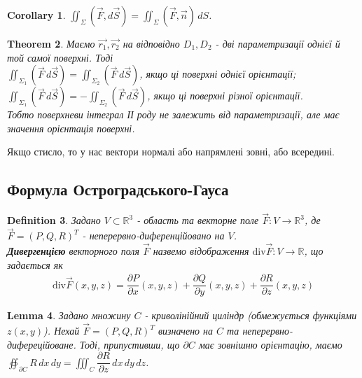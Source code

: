 \documentclass[a4paper, 10pt]{article}
\def\departial#1#2{\dfrac{\partial {#1}}{\partial {#2}}}
\theoremstyle{theoremdd}
\newtheorem{theorem}{Theorem}[subsection]
\theoremstyle{theoremdd}
\newtheorem{definition}[theorem]{Definition}
\theoremstyle{theoremdd}
\theoremstyle{theoremdd}
\theoremstyle{theoremdd}
\theoremstyle{theoremdd}
\theoremstyle{theoremdd}
\newtheorem{lemma}[theorem]{Lemma}
\theoremstyle{theoremdd}
\newtheorem{corollary}[theorem]{Corollary}
\begin{document}
\begin{corollary}
$\displaystyle\iint_\Sigma (\vec{F}, d\vec{S}) = \iint_\Sigma (\vec{F}, \vec{n})\,dS$.
\end{corollary}

\begin{theorem}
Маємо $\vec{r_1},\vec{r_2}$ на відповідно $D_1, D_2$ - дві параметризації однієї й той самої поверхні. Тоді\\
$\displaystyle\iint_{\Sigma_1} (\vec{F}\,d\vec{S}) = \iint_{\Sigma_2} (\vec{F}\,d\vec{S})$, якщо ці поверхні однієї орієнтації;\\
$\displaystyle\iint_{\Sigma_1 } (\vec{F}\,d\vec{S}) = -\iint_{\Sigma_2} (\vec{F}\,d\vec{S})$, якщо ці поверхні різної орієнтації.\\
Тобто поверхневи інтеграл ІІ роду не залежить від параметризації, але має значення орієнтація поверхні.
\end{theorem}

Якщо стисло, то у нас вектори нормалі або напрямлені зовні, або всередині.

\subsection{Формула Остроградського-Гауса}
\begin{definition}
Задано $V \subset \mathbb{R}^3$ - область та векторне поле $\vec{F}: V \to \mathbb{R}^3$, де $\vec{F} = (P,Q,R)^T$ - неперервно-диференційовано на $V$.\\
\textbf{Дивергенцією} векторного поля $\vec{F}$ назвемо відображення $\text{div} \vec{F}: V \to \mathbb{R}$, що задається як
\begin{align*}
\text{div} \vec{F}(x,y,z) = \departial{P}{x}(x,y,z) + \departial{Q}{y}(x,y,z) + \departial{R}{z}(x,y,z)
\end{align*}
\end{definition}

\begin{lemma}
Задано множину $C$ - криволінійний циліндр (обмежується функціями $z(x,y)$). Нехай $\vec{F} = (P,Q,R)^T$ визначено на $C$ та неперервно-дифереційоване. Тоді, припустивши, що $\partial  C$ має зовнішню орієнтацію, маємо\\
$\displaystyle\oiint_{\partial C} R\,dx\,dy = \iiint_C \departial{R}{z}\,dx\,dy\,dz$.
\end{lemma}
\end{document}
